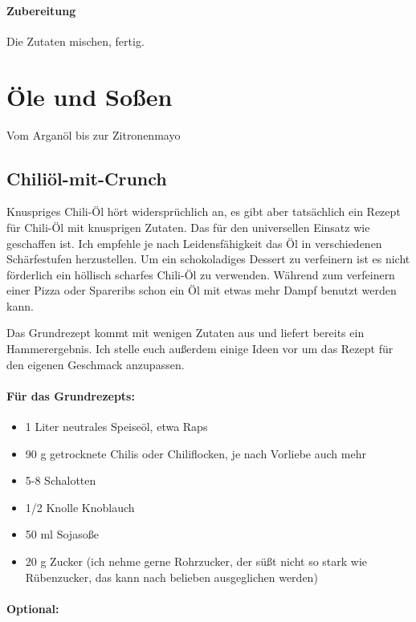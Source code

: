 \paragraph{Zubereitung}

Die Zutaten mischen, fertig.

\section{Öle und Soßen}
{Vom Arganöl bis zur Zitronenmayo}

\subsection{Chiliöl-mit-Crunch}
{Knuspriges Chili-Öl}
hört widersprüchlich an,  es gibt aber tatsächlich ein Rezept für Chili-Öl mit 
knusprigen Zutaten. Das für den universellen Einsatz wie geschaffen ist. Ich 
empfehle je nach Leidensfähigkeit das Öl in verschiedenen Schärfestufen 
herzustellen. Um ein schokoladiges Dessert zu verfeinern ist es nicht förderlich 
ein höllisch scharfes Chili-Öl zu verwenden. Während zum verfeinern einer 
Pizza oder Spareribs schon ein Öl mit etwas mehr Dampf benutzt werden kann.

Das Grundrezept kommt mit wenigen Zutaten aus und liefert bereits ein 
Hammerergebnis.
Ich stelle euch außerdem einige Ideen vor um das Rezept für den eigenen 
Geschmack anzupassen.
\newline

\paragraph{Für das Grundrezepts:}

\begin{itemize}[noitemsep]
	\item 1 Liter neutrales Speiseöl, etwa Raps
	\item 90 g getrocknete Chilis oder Chiliflocken,  je nach Vorliebe auch mehr
	\item 5-8 Schalotten
	\item 1/2 Knolle Knoblauch
	\item 50 ml Sojasoße
	\item 20 g Zucker (ich nehme gerne Rohrzucker, der süßt nicht so stark wie 
	Rübenzucker, das kann nach belieben ausgeglichen werden) 
\end{itemize}

\paragraph{Optional:}

